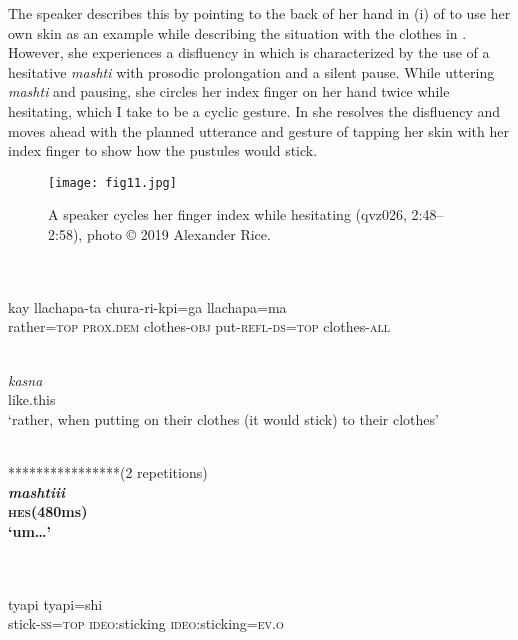 \documentclass[output=paper]{langscibook}
\begin{document}
The speaker describes this by pointing to the back of her hand in (i) of  to use her own skin as an example while describing the situation with the clothes in . However, she experiences a disfluency in  which is characterized by the use of a hesitative \textit{mashti} with prosodic prolongation and a silent pause. While uttering \textit{mashti} and pausing, she circles her index finger on her hand twice while hesitating, which I take to be a cyclic gesture. In  she resolves the disfluency and moves ahead with the planned utterance and gesture of tapping her skin with her index finger to show how the pustules would stick.

  
\begin{figure}
\texttt{[image: fig11.jpg]}
\caption{\label{fig:rice:11}A speaker cycles her finger index while hesitating (qvz026, 2:48--2:58), photo © 2019 Alexander Rice.}
\end{figure}

\ea%
\label{ex:rice:32}
\ea \label{ex:rice:32a}
\\
{\hspace{65mm}{************************}}\\ \linebreak
{} {kay} {llachapa-ta} {chura-ri-kpi=ga} {llachapa=ma}\\
{rather\textsc{=top}} {\textsc{prox.dem}} {clothes-\textsc{obj}} {put-\textsc{refl-ds=top}} {clothes-\textsc{all}}\\
\medskip

\glll {*****}\\
{\textit{kasna}}\\
{like.this}\\
\glt ‘rather, when putting on their clothes (it would stick) to their clothes’
\medskip

\ex \label{ex:rice:32b}
 \\
{****************(2 repetitions)}\\ \linebreak
\gll \textbf{\textit{mashtiii}} {}\\
    \textbf{\textsc{hes}}\textbf{(480ms)}\\
\glt    \textbf{‘um…’}
\medskip

\ex \label{ex:rice:32c}
 {}\\
\glt {\hspace{15mm}{*************}} \\
  {tyapi} {tyapi=shi}  \\
{stick-\textsc{ss=top}} {\textsc{ideo}:sticking} {\textsc{ideo}:sticking=\textsc{ev.o}} \\
\medskip
\end{document}
